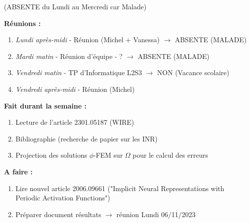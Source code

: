 (ABSENTE du Lundi au Mercredi car Malade)

\textbf{Réunions :}
\begin{enumerate}[label=\textbullet]
	\item \textit{Lundi après-midi} - Réunion (Michel + Vanessa) $\rightarrow$ ABSENTE (MALADE)
	\item \textit{Mardi matin} - Réunion d'équipe - ? $\rightarrow$ ABSENTE (MALADE)
	\item \textit{Vendredi matin} - TP d'Informatique L2S3 $\rightarrow$ NON (Vacance scolaire)
	\item \textit{Vendredi après-midi} - Réunion (Michel)
\end{enumerate}
\textbf{Fait durant la semaine :}
\begin{enumerate}[label=\textbullet]
	\item Lecture de l'article 2301.05187 (WIRE)
	\item Bibliographie (recherche de papier sur les INR)
	\item Projection des solutions $\phi$-FEM sur $\Omega$ pour le calcul des erreurs
\end{enumerate}

\textbf{A faire :}
\begin{enumerate}[label=\textbullet]
	\item Lire nouvel article 2006.09661 ("Implicit Neural Representations with Periodic Activation Functions")
	\item Préparer document résultats $\rightarrow$ réunion Lundi 06/11/2023
\end{enumerate}
